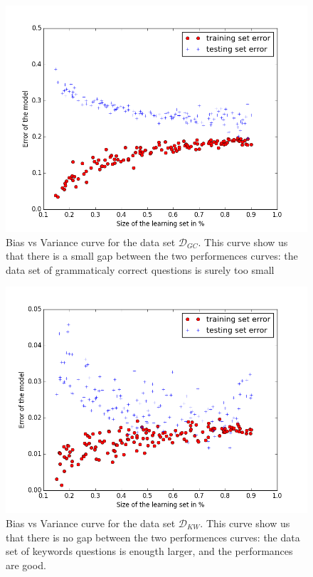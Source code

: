 \begin{figure}[!ht]
  \centering
  \caption{Bias vs Variance curve for the data set  $\mathcal{D}_{GC}$. This curve show us that there is a small gap between the two performences curves: the data set of grammaticaly correct questions is surely too small}
  \label{sandalone:bias_vs_variance_1}
    \includegraphics[scale=0.5]{../NLP-standalone-images/BiasVsVarianceD_GC.png}
\end{figure}

\begin{figure}[!ht]
  \centering
  \caption{Bias vs Variance curve for the data set  $\mathcal{D}_{KW}$. This curve show us that there is no gap between the two performences curves: the data set of keywords questions is enougth larger, and the performances are good.}
  \label{sandalone:bias_vs_variance_2}
    \includegraphics[scale=0.5]{../NLP-standalone-images/BiasVsVarianceD_KW.png}
\end{figure}

